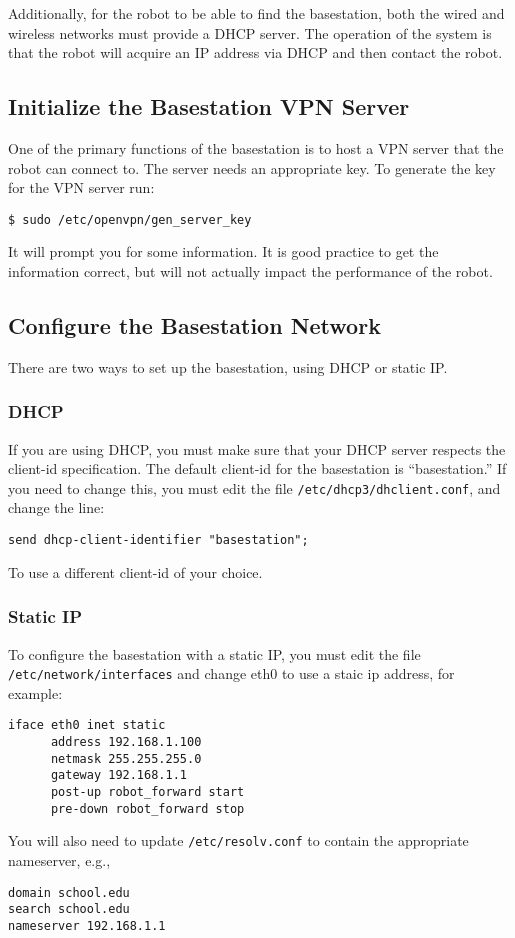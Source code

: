 Additionally, for the robot to be able to find the basestation, both
the wired and wireless networks must provide a DHCP server.  The
operation of the system is that the robot will acquire an IP address
via DHCP and then contact the robot.

\subsection{Initialize the Basestation VPN Server}
One of the primary functions of the basestation is to host a VPN
server that the robot can connect to.  The server needs an appropriate
key.  To generate the key for the VPN server run:

\begin{verbatim}
$ sudo /etc/openvpn/gen_server_key
\end{verbatim}

It will prompt you for some information.  It is good practice to get
the information correct, but will not actually impact the performance
of the robot.

\subsection{Configure the Basestation Network}

There are two ways to set up the basestation, using DHCP or static IP.

\subsubsection{DHCP}

If you are using DHCP, you must make sure that your DHCP server
respects the client-id specification.  The default client-id for the
basestation is ``basestation.''  If you need to change this, you must
edit the file \texttt{/etc/dhcp3/dhclient.conf}, and change the line:
\begin{verbatim}
send dhcp-client-identifier "basestation";
\end{verbatim}
To use a different client-id of your choice.

\subsubsection{Static IP}

To configure the basestation with a static IP, you must edit the file
\texttt{/etc/network/interfaces} and change eth0 to use a staic ip
address, for example:
\begin{verbatim}
iface eth0 inet static
      address 192.168.1.100
      netmask 255.255.255.0
      gateway 192.168.1.1
      post-up robot_forward start
      pre-down robot_forward stop
\end{verbatim}
You will also need to update \texttt{/etc/resolv.conf} to contain the
appropriate nameserver, e.g.,
\begin{verbatim}
domain school.edu
search school.edu
nameserver 192.168.1.1
\end{verbatim}


